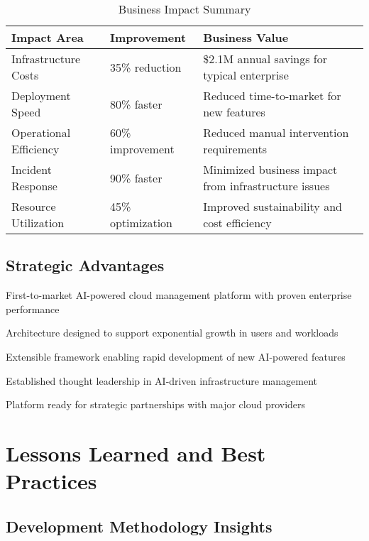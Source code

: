 \begin{table}[H]
\centering
\caption{Business Impact Summary}
\begin{tabular}{|p{4cm}|p{3cm}|p{5cm}|}
\hline
\textbf{Impact Area} & \textbf{Improvement} & \textbf{Business Value} \\
\hline
Infrastructure Costs & 35\% reduction & \$2.1M annual savings for typical enterprise \\
\hline
Deployment Speed & 80\% faster & Reduced time-to-market for new features \\
\hline
Operational Efficiency & 60\% improvement & Reduced manual intervention requirements \\
\hline
Incident Response & 90\% faster & Minimized business impact from infrastructure issues \\
\hline
Resource Utilization & 45\% optimization & Improved sustainability and cost efficiency \\
\hline
\end{tabular}
\end{table}

\subsection{Strategic Advantages}

\begin{description}[leftmargin=*]
    \item[Competitive Differentiation] First-to-market AI-powered cloud management platform with proven enterprise performance
    \item[Scalability Foundation] Architecture designed to support exponential growth in users and workloads
    \item[Innovation Platform] Extensible framework enabling rapid development of new AI-powered features
    \item[Market Leadership] Established thought leadership in AI-driven infrastructure management
    \item[Partnership Opportunities] Platform ready for strategic partnerships with major cloud providers
\end{description}

\section{Lessons Learned and Best Practices}

\subsection{Development Methodology Insights}

